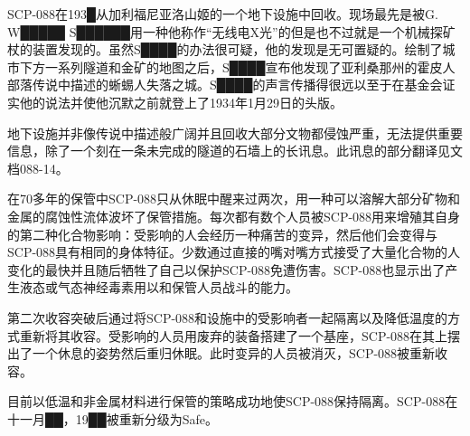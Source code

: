SCP-088在193█从加利福尼亚洛山姬的一个地下设施中回收。现场最先是被G. W█████ S██████用一种他称作“无线电X光”的但是也不过就是一个机械探矿杖的装置发现的。虽然S████的办法很可疑，他的发现是无可置疑的。绘制了城市下方一系列隧道和金矿的地图之后，S████宣布他发现了亚利桑那州的霍皮人部落传说中描述的蜥蜴人失落之城。S████的声言传播得很远以至于在基金会证实他的说法并使他沉默之前就登上了1934年1月29日的头版。

地下设施并非像传说中描述般广阔并且回收大部分文物都侵蚀严重，无法提供重要信息，除了一个刻在一条未完成的隧道的石墙上的长讯息。此讯息的部分翻译见文档088-14。

在70多年的保管中SCP-088只从休眠中醒来过两次，用一种可以溶解大部分矿物和金属的腐蚀性流体波坏了保管措施。每次都有数个人员被SCP-088用来增殖其自身的第二种化合物影响：受影响的人会经历一种痛苦的变异，然后他们会变得与SCP-088具有相同的身体特征。少数通过直接的嘴对嘴方式接受了大量化合物的人变化的最快并且随后牺牲了自己以保护SCP-088免遭伤害。SCP-088也显示出了产生液态或气态神经毒素用以和保管人员战斗的能力。

第二次收容突破后通过将SCP-088和设施中的受影响者一起隔离以及降低温度的方式重新将其收容。受影响的人员用废弃的装备搭建了一个基座，SCP-088在其上摆出了一个休息的姿势然后重归休眠。此时变异的人员被消灭，SCP-088被重新收容。

目前以低温和非金属材料进行保管的策略成功地使SCP-088保持隔离。SCP-088在十一月██，19██被重新分级为Safe。
